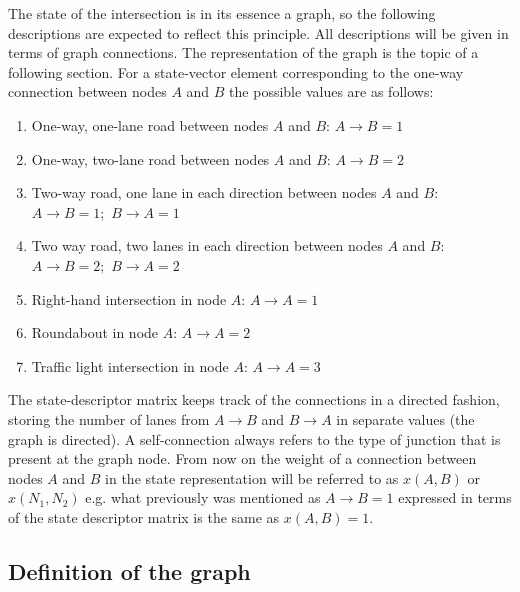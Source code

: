 \documentclass[
]{elteikthesis}[2023/04/10]
\begin{document}
The state of the intersection is in its essence a graph, so the following
descriptions are expected to reflect this principle. All descriptions
will be given in terms of graph connections. The representation of
the graph is the topic of a following section. For a state-vector
element corresponding to the one-way connection between nodes $A$
and $B$ the possible values are as follows:
\begin{enumerate}
\item One-way, one-lane road between nodes $A$ and $B$: $A\rightarrow B=1$
\item One-way, two-lane road between nodes $A$ and $B$: $A\rightarrow B=2$
\item Two-way road, one lane in each direction between nodes $A$ and $B$:
$A\rightarrow B=1;$ $B\rightarrow A=1$
\item Two way road, two lanes in each direction between nodes $A$ and $B$:
$A\rightarrow B=2;$ $B\rightarrow A=2$
\item Right-hand intersection in node $A$: $A\rightarrow A=1$
\item Roundabout in node $A$: $A\rightarrow A=2$
\item Traffic light intersection in node $A$: $A\rightarrow A=3$
\end{enumerate}
The state-descriptor matrix keeps track of the connections in a directed
fashion, storing the number of lanes from $A\rightarrow B$ and $B\rightarrow A$
in separate values (the graph is directed). A self-connection always
refers to the type of junction that is present at the graph node.
From now on the weight of a connection between nodes $A$ and $B$
in the state representation will be referred to as $x(A,B)$ or $x(N_{1},N_{2})$
e.g. what previously was mentioned as $A\rightarrow B=1$ expressed
in terms of the state descriptor matrix is the same as $x(A,B)=1$.

\subsection{Definition of the graph}
\end{document}
